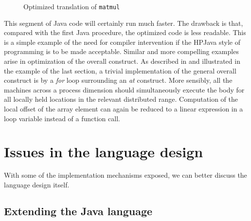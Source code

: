 \begin{figure}[htb]
\caption{Optimized translation of {\tt matmul}\label{fig:matmul}}
\end{figure}

This segment of Java code will certainly run much faster.  The drawback
is that, compared with the first Java procedure, the optimized code is
less readable.  This is a simple example of the need for compiler
intervention if the HPJava style of programming is to be made
acceptable.  Similar and more compelling examples arise in optimization
of the overall construct.  As described in \cite{High_Level_SPMD} and
illustrated in the example of the last section, a trivial
implementation of the general overall construct is by a {\em for} loop
surrounding an {\em at} construct.  More sensibly, all the machines
across a process dimension should simultaneously execute the body for
all locally held locations in the relevant distributed range.
Computation of the local offset of the array element can again be
reduced to a linear expression in a loop variable instead of a function
call.

\section{Issues in the language design}
\label{sec:consideration}

With some of the implementation mechanisms exposed, we can
better discuss the language design itself.

\subsection{Extending the Java language}

